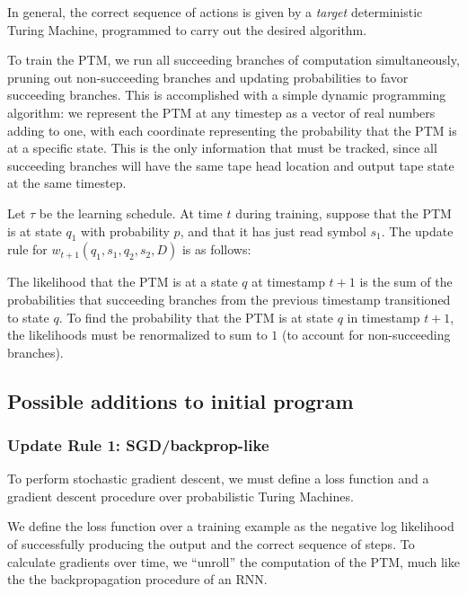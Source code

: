 \documentclass{article}
\begin{document}
In general, the correct sequence of actions is given by a \textit{target} deterministic Turing Machine, programmed to carry out the desired algorithm.


To train the PTM, we run all succeeding branches of computation simultaneously, pruning out non-succeeding branches and updating probabilities to favor succeeding branches. This is accomplished with a simple dynamic programming algorithm: we represent the PTM at any timestep as a vector of real numbers adding to one, with each coordinate representing the probability that the PTM is at a specific state. This is the only information that must be tracked, since all succeeding branches will have the same tape head location and output tape state at the same timestep.

Let $\tau$ be the learning schedule. At time $t$ during training, suppose that the PTM is at state $q_1$ with probability $p$, and that it has just read symbol $s_1$. The update rule for $w_{t+1}(q_1, s_1, q_2, s_2, D)$ is as follows:

The likelihood that the PTM is at a state $q$ at timestamp $t+1$ is the sum of the probabilities that succeeding branches from the previous timestamp transitioned to state $q$. To find the probability that the PTM is at state $q$ in timestamp $t+1$, the likelihoods must be renormalized to sum to $1$ (to account for non-succeeding branches).

\subsection{Possible additions to initial program}

\subsubsection{Update Rule 1: SGD/backprop-like}
To perform stochastic gradient descent, we must define a loss function and a gradient descent procedure over probabilistic Turing Machines. 

We define the loss function over a training example as the negative log likelihood of successfully producing the output and the correct sequence of steps. To calculate gradients over time, we ``unroll'' the computation of the PTM, much like the the backpropagation procedure of an RNN. 
\end{document}
